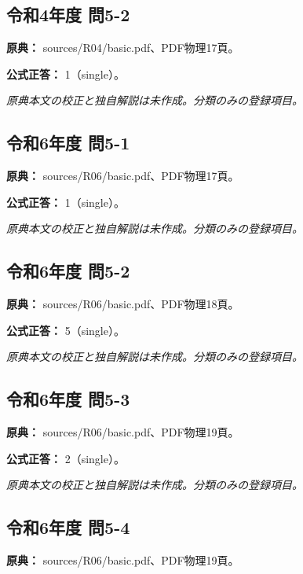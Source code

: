 \subsection{令和4年度 問5-2}
\label{q:r04-reg-basic-5-2}

\noindent\textbf{原典：} sources/R04/basic.pdf、PDF物理17頁。

\textbf{公式正答：} 1（single）。

\par\textit{原典本文の校正と独自解説は未作成。分類のみの登録項目。}

\subsection{令和6年度 問5-1}
\label{q:r06-reg-basic-5-1}

\noindent\textbf{原典：} sources/R06/basic.pdf、PDF物理17頁。

\textbf{公式正答：} 1（single）。

\par\textit{原典本文の校正と独自解説は未作成。分類のみの登録項目。}

\subsection{令和6年度 問5-2}
\label{q:r06-reg-basic-5-2}

\noindent\textbf{原典：} sources/R06/basic.pdf、PDF物理18頁。

\textbf{公式正答：} 5（single）。

\par\textit{原典本文の校正と独自解説は未作成。分類のみの登録項目。}

\subsection{令和6年度 問5-3}
\label{q:r06-reg-basic-5-3}

\noindent\textbf{原典：} sources/R06/basic.pdf、PDF物理19頁。

\textbf{公式正答：} 2（single）。

\par\textit{原典本文の校正と独自解説は未作成。分類のみの登録項目。}

\subsection{令和6年度 問5-4}
\label{q:r06-reg-basic-5-4}

\noindent\textbf{原典：} sources/R06/basic.pdf、PDF物理19頁。

